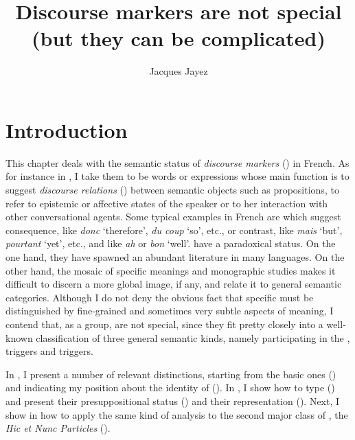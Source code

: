 \documentclass[output=paper,colorlinks,citecolor=brown]{langscibook}
\author{Jacques Jayez\orcid{} \affiliation{ENS de Lyon \& LORIA, CNRS}}
\title{Discourse markers are not special (but they can be complicated)}
\begin{document}
	\maketitle

	\section{Introduction}

	This chapter deals with the semantic status of \textit{discourse markers} () in French. As for instance in \citet[151]{Degand:2014}, I take them to be words or expressions whose main function is to suggest \textit{discourse relations} () between semantic objects such as propositions, to refer to epistemic or affective states of the speaker or to her interaction with other conversational agents. Some typical examples in French are  which suggest consequence, like \textit{donc} `therefore', \textit{du coup} `so', etc., or contrast, like \textit{mais} `but', \textit{pourtant} `yet', etc., and  like \textit{ah} or \textit{bon} `well'.  have a paradoxical status. On the one hand, they have spawned an abundant literature in many languages. On the other hand, the mosaic of specific meanings and monographic studies makes it difficult to discern a more global image, if any, and relate it to general semantic categories. Although I do not deny the obvious fact that specific  must be distinguished by fine-grained and sometimes very subtle aspects of meaning, I contend that, as a group,  are not special, since they fit pretty closely into a well-known classification of three general semantic kinds, namely  participating in the ,  triggers and  triggers.
    
	In , I present a number of relevant distinctions, starting from the basic ones () and indicating my position about the identity of  (). In , I show how to type   () and present their presuppositional status () and their representation (). Next, I show in  how to apply the same kind of analysis to the second major class of , the \textit{Hic et Nunc Particles} ().
\end{document}
